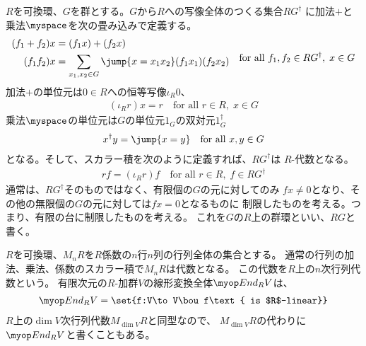 	\begin{definition}[群環]\label{def:群環} %
		$R$を可換環、$G$を群とする。$G$から$R$への写像全体のつくる集合$RG^\dag$
		に加法$+$と乗法$\myspace$を次の畳み込みで定義する。
		\begin{equation*}\begin{split} %
			(f_1+f_2)x &= (f_1x) + (f_2x) \\
			(f_1f_2)x &= \sum_{x_1,x_2\in G}\jump{x=x_1x_2}(f_1x_1)(f_2x_2) \\
		\end{split}
			\quad\text{for all }f_1,f_2\in RG^\dag,\;x\in G
		\end{equation*} %
		加法$+$の単位元は$0\in R$への恒等写像$\iota_R0$、
		\begin{equation*}\begin{split} %
			(\iota_Rr)x = r \quad\text{for all }r\in R,\;x\in G
		\end{split}\end{equation*} %
		乗法$\myspace$の単位元は$G$の単位元$1_G$の双対元$1_G^\dag$
		\begin{equation*}\begin{split} %
			x^\dag y = \jump{x=y} \quad\text{for all }x,y\in G
		\end{split}\end{equation*} %
		となる。そして、スカラー積を次のように定義すれば、$RG^\dag$は
		$R$-代数となる。
		\begin{equation*}\begin{split} %
			rf = (\iota_Rr)f \quad\text{for all }r\in R,\;f\in RG^\dag
		\end{split}\end{equation*} %
		通常は、$RG^\dag$そのものではなく、有限個の$G$の元に対してのみ
		$fx\neq0$となり、その他の無限個の$G$の元に対しては$fx=0$となるものに
		制限したものを考える。つまり、有限の台に制限したものを考える。
		これを$G$の$R$上の群環といい、$RG$と書く。
	\end{definition} %

	\begin{definition}[行列代数]\label{def:行列代数} %
		$R$を可換環、$M_nR$を$R$係数の$n$行$n$列の行列全体の集合とする。
		通常の行列の加法、乗法、係数のスカラー積で$M_nR$は代数となる。
		この代数を$R$上の$n$次行列代数という。
		有限次元の$R$-加群$V$の線形変換全体$\End_RV$は、
		\begin{equation*}\begin{split} %
			\End_RV=\set{f:V\to V\bou f\text{ is $R$-linear}}
		\end{split}\end{equation*} %
		$R$上の$\dim V$次行列代数$M_{\dim V}R$と同型なので、
		$M_{\dim V}R$の代わりに$\End_RV$と書くこともある。
	\end{definition} %

